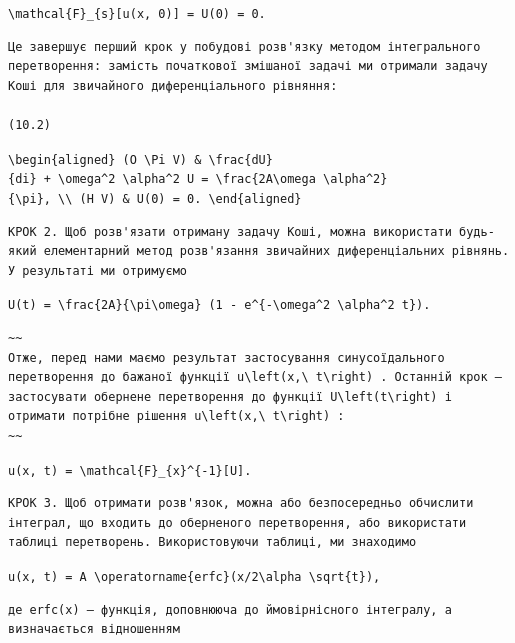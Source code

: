 \documentclass[
  ukrainian,
]{article}
\begin{document}
\texttt{\textbackslash{}mathcal\{F\}\_\{s\}{[}u(x,\ 0){]}\ =\ U(0)\ =\ 0.}

\begin{verbatim}
Це завершує перший крок у побудові розв'язку методом інтегрального перетворення: замість початкової змішаної задачі ми отримали задачу Коші для звичайного диференціального рівняння:

(10.2)
\end{verbatim}

\texttt{\textbackslash{}begin\{aligned\}\ (O\ \textbackslash{}Pi\ V)\ \&\ \textbackslash{}frac\{dU\}\{di\}\ +\ \textbackslash{}omega\^{}2\ \textbackslash{}alpha\^{}2\ U\ =\ \textbackslash{}frac\{2A\textbackslash{}omega\ \textbackslash{}alpha\^{}2\}\{\textbackslash{}pi\},\ \textbackslash{}\textbackslash{}\ (H\ V)\ \&\ U(0)\ =\ 0.\ \textbackslash{}end\{aligned\}}

\begin{verbatim}
КРОК 2. Щоб розв'язати отриману задачу Коші, можна використати будь-який елементарний метод розв'язання звичайних диференціальних рівнянь. У результаті ми отримуємо
\end{verbatim}

\texttt{U(t)\ =\ \textbackslash{}frac\{2A\}\{\textbackslash{}pi\textbackslash{}omega\}\ (1\ -\ e\^{}\{-\textbackslash{}omega\^{}2\ \textbackslash{}alpha\^{}2\ t\}).}

\begin{verbatim}
~~
Отже, перед нами маємо результат застосування синусоїдального перетворення до бажаної функції u\left(x,\ t\right) . Останній крок — застосувати обернене перетворення до функції U\left(t\right) і отримати потрібне рішення u\left(x,\ t\right) :
~~
\end{verbatim}

\texttt{u(x,\ t)\ =\ \textbackslash{}mathcal\{F\}\_\{x\}\^{}\{-1\}{[}U{]}.}

\begin{verbatim}
КРОК 3. Щоб отримати розв'язок, можна або безпосередньо обчислити інтеграл, що входить до оберненого перетворення, або використати таблиці перетворень. Використовуючи таблиці, ми знаходимо
\end{verbatim}

\texttt{u(x,\ t)\ =\ A\ \textbackslash{}operatorname\{erfc\}(x/2\textbackslash{}alpha\ \textbackslash{}sqrt\{t\}),}

\begin{verbatim}
де erfc(x) — функція, доповнююча до ймовірнісного інтегралу, а визначається відношенням
\end{verbatim}
\end{document}
